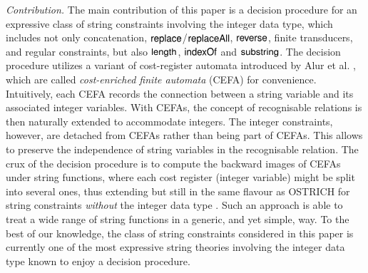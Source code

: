 \noindent\emph{Contribution.} The main contribution of this paper is a decision procedure for an expressive class of string constraints involving the integer data type, which includes not only concatenation, $\mathsf{replace}$/$\mathsf{replaceAll}$, $\mathsf{reverse}$, finite transducers, and regular constraints, but also $\mathsf{length}$, $\mathsf{indexOf}$ and $\mathsf{substring}$. The decision procedure utilizes a variant of cost-register automata introduced by Alur et al. \cite{RLJ+13}, which are called \emph{cost-enriched finite automata} (CEFA) for convenience. 
Intuitively, each CEFA records the connection between a string variable and its associated integer variables.
With CEFAs, the concept of recognisable relations is then naturally extended to accommodate integers. The integer constraints, however, are detached from CEFAs rather than being part of CEFAs. This allows to preserve the independence of string variables in the recognisable relation. 
The crux of the decision procedure is to compute the backward images of CEFAs under string functions, where each cost register (integer variable) might be split into several ones, thus extending but still in the same flavour as OSTRICH for string constraints \emph{without} the integer data type \cite{CHL+19}. 
Such an approach %
is able to treat %
a wide range of string functions in a generic, and yet simple, way. 
%
To the best of our knowledge, the class of string constraints considered in this paper is currently one of the most expressive string theories involving the integer data type known to enjoy a decision procedure. 
%



